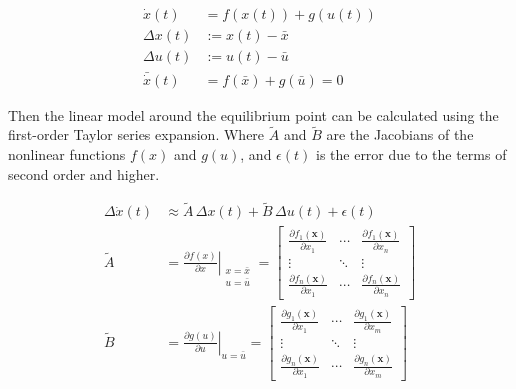 \documentclass[12pt]{article}
\begin{document}
\begin{equation}
  \begin{split}
    \dot{x}(t) &= f(x(t)) + g(u(t)) \\
    \Delta x(t) &:= x(t) - \bar{x} \\
    \Delta u(t) &:= u(t) - \bar{u} \\
    \bar{\dot{x}}(t) &= f(\bar{x}) + g(\bar{u}) = 0
  \end{split}
\end{equation}

Then the linear model around the equilibrium point can be calculated using the first-order Taylor series expansion. Where $\tilde{A}$ and $\tilde{B}$ are the Jacobians of the nonlinear functions $f(x)$ and $g(u)$, and $\epsilon (t)$ is the error due to the terms of second order and higher.

\begin{equation}
  \begin{split}
    \label{eq:linearization}
    \Delta\dot{x}(t) &\approx  \tilde{A} \, \Delta x(t) + \tilde{B} \, \Delta u(t) + \epsilon (t) \\
    \tilde{A} &= \left. \frac{ \partial f(x)} {\partial x} \right|_{\begin{smallmatrix} x = \bar{x} \\ u = \bar{u} \end{smallmatrix}} = \begin{bmatrix}
    \frac{\partial f_1(\mathbf{x})}{\partial x_1} & \cdots & \frac{\partial f_1(\mathbf{x})}{\partial x_n} \\
    \vdots & \ddots & \vdots \\
    \frac{\partial f_n(\mathbf{x})}{\partial x_1} & \cdots & \frac{\partial f_n(\mathbf{x})}{\partial x_n}
    \end{bmatrix} \\
    \tilde{B} &= \left. \frac{\partial g(u)} {\partial u} \right|_{u = \bar{u}} = \begin{bmatrix}
    \frac{\partial g_1(\mathbf{x})}{\partial x_1} & \cdots & \frac{\partial g_1(\mathbf{x})}{\partial x_m} \\
    \vdots & \ddots & \vdots \\
    \frac{\partial g_n(\mathbf{x})}{\partial x_1} & \cdots & \frac{\partial g_n(\mathbf{x})}{\partial x_m}
    \end{bmatrix} \\
  \end{split}
\end{equation}
\end{document}
